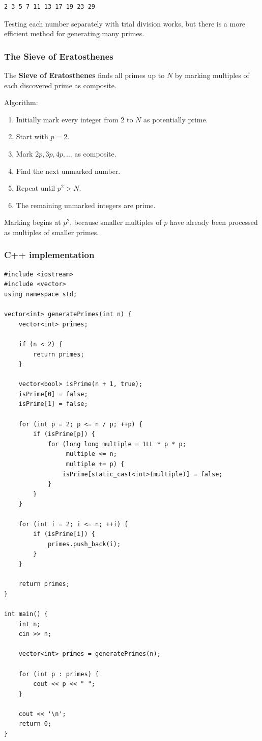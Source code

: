 \begin{lstlisting}[style=pseudocode]
2 3 5 7 11 13 17 19 23 29
\end{lstlisting}

Testing each number separately with trial division works, but there is a more efficient method for generating many primes.

\subsubsection{The Sieve of Eratosthenes}

The \textbf{Sieve of Eratosthenes} finds all primes up to $N$ by marking multiples of each discovered prime as composite.

Algorithm:

\begin{enumerate}
    \item Initially mark every integer from 2 to $N$ as potentially prime.
    \item Start with $p=2$.
    \item Mark $2p,3p,4p,\ldots$ as composite.
    \item Find the next unmarked number.
    \item Repeat until $p^2>N$.
    \item The remaining unmarked integers are prime.
\end{enumerate}

Marking begins at $p^2$, because smaller multiples of $p$ have already been processed as multiples of smaller primes.

\subsubsection{C++ implementation}

\begin{lstlisting}[style=cppstyle]
#include <iostream>
#include <vector>
using namespace std;

vector<int> generatePrimes(int n) {
    vector<int> primes;

    if (n < 2) {
        return primes;
    }

    vector<bool> isPrime(n + 1, true);
    isPrime[0] = false;
    isPrime[1] = false;

    for (int p = 2; p <= n / p; ++p) {
        if (isPrime[p]) {
            for (long long multiple = 1LL * p * p;
                 multiple <= n;
                 multiple += p) {
                isPrime[static_cast<int>(multiple)] = false;
            }
        }
    }

    for (int i = 2; i <= n; ++i) {
        if (isPrime[i]) {
            primes.push_back(i);
        }
    }

    return primes;
}

int main() {
    int n;
    cin >> n;

    vector<int> primes = generatePrimes(n);

    for (int p : primes) {
        cout << p << " ";
    }

    cout << '\n';
    return 0;
}
\end{lstlisting}

